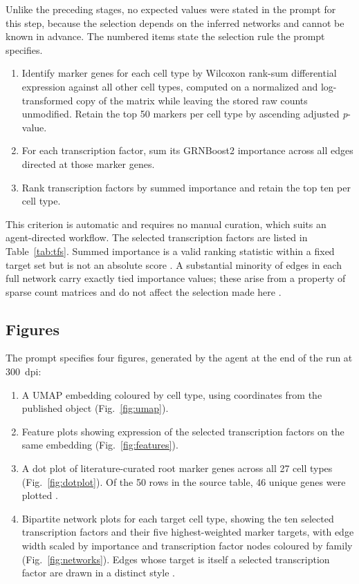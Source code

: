 Unlike the preceding stages, no expected values were stated in the prompt for this step, because the selection depends on the inferred networks and cannot be known in advance. The numbered items state the selection rule the prompt specifies.

\begin{enumerate}[leftmargin=*]
\item Identify marker genes for each cell type by Wilcoxon rank-sum differential expression \cite{wolf2018} against all other cell types, computed on a normalized and log-transformed copy of the matrix while leaving the stored raw counts unmodified. Retain the top 50 markers per cell type by ascending adjusted \textit{p}-value.

\item For each transcription factor, sum its GRNBoost2 importance across all edges directed at those marker genes.

\item Rank transcription factors by summed importance and retain the top ten per cell type.
\end{enumerate}

This criterion is automatic and requires no manual curation, which suits an agent-directed workflow. The selected transcription factors are listed in Table~\ref{tab:tfs}. Summed importance is a valid ranking statistic within a fixed target set but is not an absolute score . A substantial minority of edges in each full network carry exactly tied importance values; these arise from a property of sparse count matrices and do not affect the selection made here .

\subsection{Figures}

The prompt specifies four figures, generated by the agent at the end of the run at 300~dpi:

\begin{enumerate}[leftmargin=*]
\item A UMAP embedding coloured by cell type, using coordinates from the published object (Fig.~\ref{fig:umap}).
\item Feature plots showing expression of the selected transcription factors on the same embedding (Fig.~\ref{fig:features}).
\item A dot plot of literature-curated root marker genes across all 27 cell types (Fig.~\ref{fig:dotplot}). Of the 50 rows in the source table, 46 unique genes were plotted .
\item Bipartite network plots for each target cell type, showing the ten selected transcription factors and their five highest-weighted marker targets, with edge width scaled by importance and transcription factor nodes coloured by family (Fig.~\ref{fig:networks}). Edges whose target is itself a selected transcription factor are drawn in a distinct style .
\end{enumerate}

